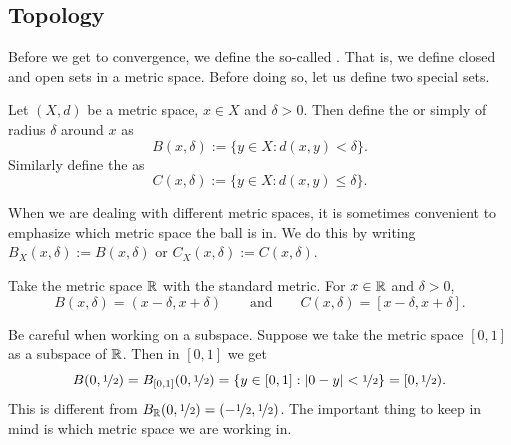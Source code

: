 
\subsection{Topology}

Before we get to convergence,
we define the so-called \emph{}.
That is,
we define closed and open sets in a metric space.
Before doing so,
let us define two special sets.

\begin{defn}
Let $(X,d)$ be a metric space, $x \in X$ and $\delta > 0$.  Then define
the \emph{} or simply \emph{} of radius $\delta$
around $x$ as
\begin{equation*}
B(x,\delta) := \{ y \in X : d(x,y) < \delta \} .
\end{equation*}
Similarly define the \emph{} as
\begin{equation*}
C(x,\delta) := \{ y \in X : d(x,y) \leq \delta \} .
\end{equation*}
\end{defn}

When we are dealing with different metric spaces, it is sometimes 
convenient to emphasize which metric space the ball is in.  We do this by
writing $B_X(x,\delta) := B(x,\delta)$ or $C_X(x,\delta) := C(x,\delta)$.

\begin{example}
Take the metric space ${\mathbb{R}}$ with the standard metric.  For
$x \in {\mathbb{R}}$ and $\delta > 0$,
\begin{equation*}
B(x,\delta) = (x-\delta,x+\delta) \qquad \text{and} \qquad
C(x,\delta) = [x-\delta,x+\delta] .
\end{equation*}
\end{example}

\begin{example}
Be careful when working on a subspace.  Suppose we take the
metric space $[0,1]$ as a subspace of ${\mathbb{R}}$.  Then in $[0,1]$
we get
\begin{equation*}
B(0,\nicefrac{1}{2}) = B_{[0,1]}(0,\nicefrac{1}{2})
= \{ y \in [0,1] : \left\lvert {0-y} \right\rvert < \nicefrac{1}{2} \}
= [0,\nicefrac{1}{2}) .
\end{equation*}
This is different from $B_{{\mathbb{R}}}(0,\nicefrac{1}{2}) =
(-\nicefrac{1}{2},\nicefrac{1}{2})$.
The important thing to keep in mind is which metric space we are working
in.
\end{example}


